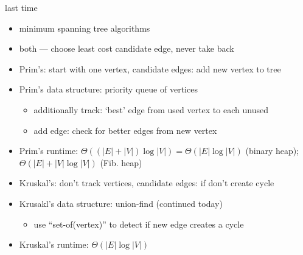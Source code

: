 \begin{comment}
\begin{frame}{last time}
    \begin{itemize}
    \item travelling salesperson problem
    \item i.e. min weight Hamiltonian cycle
        \begin{itemize}
        \item = visit all vertices once and return to start
        \end{itemize}
    \item the branch-and-bound idea
    \item lab preview:
        \begin{itemize}
        \item topological sort / naive TSP / report on TSP acceleration techs.
        \end{itemize}
    \item spanning tree --- connected graph with no cycles
        \begin{itemize}
        \item i.e. no extra edges
        \item application: transport network
        \end{itemize}
    \item minimum spanning tree: spanning tree with least weight
    \end{itemize}
\end{frame}
\end{comment}

\begin{frame}{last time}
    \begin{itemize}
    \item minimum spanning tree algorithms
    \item both  --- choose least cost candidate edge, never take back
    \item Prim's: start with one vertex, candidate edges: add new vertex to tree
    \item Prim's data structure: priority queue of vertices
        \begin{itemize}
        \item additionally track: `best' edge from used vertex to each unused
        \item add edge: check for better edges from new vertex
        \end{itemize}
    \item Prim's runtime: $\Theta((|E|+|V|)\log|V|)= \Theta(|E|\log|V|)$ (binary heap); $\Theta(|E|+|V|\log|V|)$ (Fib. heap)
    \item Kruskal's: don't track vertices, candidate edges: if don't create cycle
    \item Krusakl's data structure: union-find (continued today)
        \begin{itemize}
        \item use ``set-of(vertex)'' to detect if new edge creates a cycle
        \end{itemize}
    \item Kruskal's runtime: $\Theta(|E|\log|V|)$
    \end{itemize}
\end{frame}
